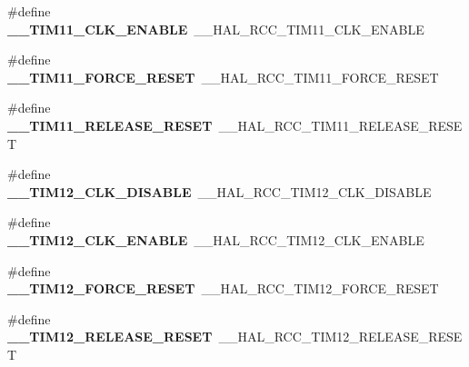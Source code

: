 \begin{DoxyCompactItemize}
\item 
\hypertarget{group___h_a_l___r_c_c___aliased_ga6cc8eb068efb87a58f7e4ed1c052bda6}{\#define {\bfseries \-\_\-\-\_\-\-T\-I\-M11\-\_\-\-C\-L\-K\-\_\-\-E\-N\-A\-B\-L\-E}~\-\_\-\-\_\-\-H\-A\-L\-\_\-\-R\-C\-C\-\_\-\-T\-I\-M11\-\_\-\-C\-L\-K\-\_\-\-E\-N\-A\-B\-L\-E}\label{group___h_a_l___r_c_c___aliased_ga6cc8eb068efb87a58f7e4ed1c052bda6}

\item 
\hypertarget{group___h_a_l___r_c_c___aliased_gabd9681b9a7bba79cd54826cce394f45a}{\#define {\bfseries \-\_\-\-\_\-\-T\-I\-M11\-\_\-\-F\-O\-R\-C\-E\-\_\-\-R\-E\-S\-E\-T}~\-\_\-\-\_\-\-H\-A\-L\-\_\-\-R\-C\-C\-\_\-\-T\-I\-M11\-\_\-\-F\-O\-R\-C\-E\-\_\-\-R\-E\-S\-E\-T}\label{group___h_a_l___r_c_c___aliased_gabd9681b9a7bba79cd54826cce394f45a}

\item 
\hypertarget{group___h_a_l___r_c_c___aliased_ga824e2559156eae3f0a571246d3698431}{\#define {\bfseries \-\_\-\-\_\-\-T\-I\-M11\-\_\-\-R\-E\-L\-E\-A\-S\-E\-\_\-\-R\-E\-S\-E\-T}~\-\_\-\-\_\-\-H\-A\-L\-\_\-\-R\-C\-C\-\_\-\-T\-I\-M11\-\_\-\-R\-E\-L\-E\-A\-S\-E\-\_\-\-R\-E\-S\-E\-T}\label{group___h_a_l___r_c_c___aliased_ga824e2559156eae3f0a571246d3698431}

\item 
\hypertarget{group___h_a_l___r_c_c___aliased_gab8ee1eb9468f1037ae0b82dae47b4e36}{\#define {\bfseries \-\_\-\-\_\-\-T\-I\-M12\-\_\-\-C\-L\-K\-\_\-\-D\-I\-S\-A\-B\-L\-E}~\-\_\-\-\_\-\-H\-A\-L\-\_\-\-R\-C\-C\-\_\-\-T\-I\-M12\-\_\-\-C\-L\-K\-\_\-\-D\-I\-S\-A\-B\-L\-E}\label{group___h_a_l___r_c_c___aliased_gab8ee1eb9468f1037ae0b82dae47b4e36}

\item 
\hypertarget{group___h_a_l___r_c_c___aliased_gaa238e8a1840193501450360652992b0a}{\#define {\bfseries \-\_\-\-\_\-\-T\-I\-M12\-\_\-\-C\-L\-K\-\_\-\-E\-N\-A\-B\-L\-E}~\-\_\-\-\_\-\-H\-A\-L\-\_\-\-R\-C\-C\-\_\-\-T\-I\-M12\-\_\-\-C\-L\-K\-\_\-\-E\-N\-A\-B\-L\-E}\label{group___h_a_l___r_c_c___aliased_gaa238e8a1840193501450360652992b0a}

\item 
\hypertarget{group___h_a_l___r_c_c___aliased_gae56b393a7c3f23192414bb515d3e0ce7}{\#define {\bfseries \-\_\-\-\_\-\-T\-I\-M12\-\_\-\-F\-O\-R\-C\-E\-\_\-\-R\-E\-S\-E\-T}~\-\_\-\-\_\-\-H\-A\-L\-\_\-\-R\-C\-C\-\_\-\-T\-I\-M12\-\_\-\-F\-O\-R\-C\-E\-\_\-\-R\-E\-S\-E\-T}\label{group___h_a_l___r_c_c___aliased_gae56b393a7c3f23192414bb515d3e0ce7}

\item 
\hypertarget{group___h_a_l___r_c_c___aliased_gab3ad7993389232812fa3634cb8f7909f}{\#define {\bfseries \-\_\-\-\_\-\-T\-I\-M12\-\_\-\-R\-E\-L\-E\-A\-S\-E\-\_\-\-R\-E\-S\-E\-T}~\-\_\-\-\_\-\-H\-A\-L\-\_\-\-R\-C\-C\-\_\-\-T\-I\-M12\-\_\-\-R\-E\-L\-E\-A\-S\-E\-\_\-\-R\-E\-S\-E\-T}\label{group___h_a_l___r_c_c___aliased_gab3ad7993389232812fa3634cb8f7909f}


\end{DoxyCompactItemize}
